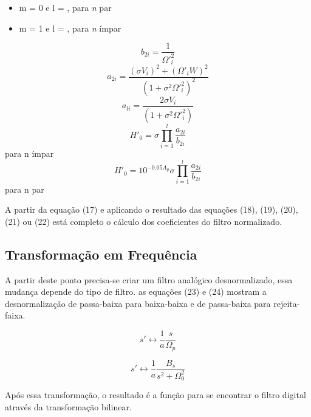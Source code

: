 \documentclass[a4paper,10pt]{article}
\begin{document}
		\begin{itemize}
			\item {m = 0 e l = ,
			 para \textit{n} par}
			
			\item {m = 1 e l = ,
			 para \textit{n} ímpar}
		\end{itemize}
		\begin{equation}
			b_{2i} = \frac{1}{\Omega'^{2}_{i}}
		\end{equation}
		\begin{equation}
			a_{2i} = \frac{(\sigma V_i)^{2} + (\Omega'_{i}W)^{2}}{(1+\sigma^{2}\Omega'^{2}_{i})^{2}}
		\end{equation}
		\begin{equation}
			a_{li} = \frac{2\sigma V_{i}}{(1+\sigma^{2}\Omega'^{2}_{i})}
		\end{equation}		
		\begin{equation}
			H'_{0} = \sigma \prod_{i=1}^{l}\frac{\textit{a}_{2i}}{\textit{b}_{2i}}
		\end{equation} para n ímpar
		\begin{equation}
			H'_{0} = 10^{-0.05A_{p}}\sigma \prod_{i=1}^{l}\frac{\textit{a}_{2i}}{\textit{b}_{2i}}					\end{equation} para n par
			
		A partir da equação (17) e aplicando o resultado das equações (18), (19), (20), (21) ou (22) está completo o cálculo dos coeficientes do filtro normalizado.
		
\subsection{Transformação em Frequência}
	A partir deste ponto precisa-se criar um filtro analógico desnormalizado, essa mudança depende do tipo de filtro. as equações (23) e (24) mostram a desnormalização de passa-baixa para baixa-baixa e de passa-baixa para rejeita-faixa.

	\begin{equation}	
		s' \leftrightarrow \frac{1}{a} \frac{s}{\Omega_{p}}
	\end{equation}
	
	\begin{equation}
		s' \leftrightarrow \frac{1}{a} \frac{B_{s}}{s^{2} + \Omega_{0}^{2}}
	\end{equation}
	
	Após essa transformação, o resultado é a função para se encontrar o filtro digital através da transformação bilinear. 
				
\end{document}
